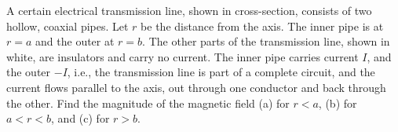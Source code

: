 A certain electrical transmission line, shown in cross-section,
consists of two hollow, coaxial pipes. Let $r$ be the distance from
the axis.  The inner pipe is at $r=a$ and the outer at $r=b$. 
The other parts of the transmission line, shown in white, are
insulators and carry no current.
The
inner pipe carries current $I$, and the outer $-I$, i.e., the transmission line
is part of a complete circuit, and the current flows parallel to the axis, out through one
conductor and back through the other.  Find the magnitude of the
magnetic field (a) for $r<a$, (b) for $a<r<b$, and (c) for $r>b$.
